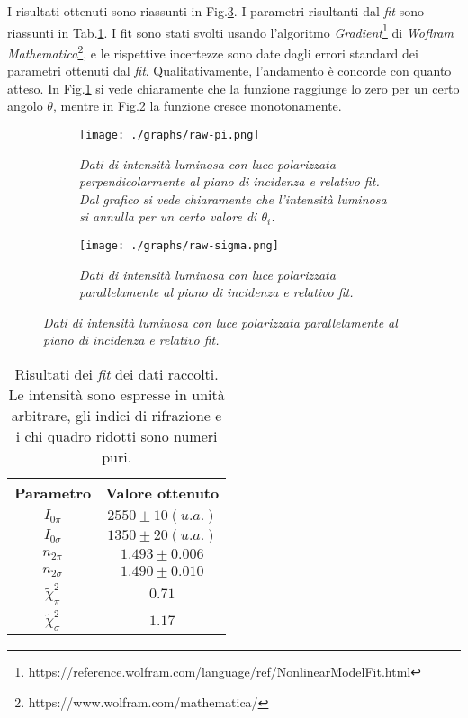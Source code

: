   I risultati ottenuti sono riassunti in Fig.\ref{fig:dati-raw}.
  I parametri risultanti dal \emph{fit} sono riassunti in Tab.\ref{tab:risultati-fit}.
  I fit sono stati svolti usando l'algoritmo \emph{Gradient}\footnote{https://reference.wolfram.com/language/ref/NonlinearModelFit.html} di \emph{Woflram Mathematica}\footnote{https://www.wolfram.com/mathematica/}, e le rispettive incertezze %
  sono date dagli errori standard dei parametri ottenuti dal \emph{fit}.                                          %
  Qualitativamente, l'andamento è concorde con quanto atteso. In Fig.\ref{fig:raw-pi}
  si vede chiaramente che la funzione raggiunge lo zero per un certo angolo $\theta$,
  mentre in Fig.\ref{fig:raw-sigma} la funzione cresce monotonamente.
  \begin{figure}[H]
    \centering
    \caption{Dati raccolti}
    \begin{subfigure}[t]{.4\textwidth}
      \texttt{[image: ./graphs/raw-pi.png]}
      \caption{
        \emph{
          Dati di intensità luminosa con luce polarizzata perpendicolarmente al
          piano di incidenza e relativo fit. Dal grafico si vede chiaramente che
          l'intensità luminosa si annulla per un certo valore di $\theta_i$.
        }
      }
      \label{fig:raw-pi}
    \end{subfigure}
    \hspace{20mm}
    \begin{subfigure}[t]{.4\textwidth}
      \texttt{[image: ./graphs/raw-sigma.png]}
      \caption{
        \emph{
          Dati di intensità luminosa con luce polarizzata parallelamente al
          piano di incidenza e relativo fit.
        }
      }
      \label{fig:raw-sigma}
    \end{subfigure}
    \label{fig:dati-raw}
  \end{figure}
  \begin{table}[ht]
    \centering
    \caption{
      Risultati dei \emph{fit} dei dati raccolti. Le intensità sono espresse in unità arbitrare, gli indici
      di rifrazione e i chi quadro ridotti sono numeri puri.
    }
    \begin{tabular}[t]{cc}
      \toprule
      Parametro &Valore ottenuto\\
      \midrule
      $I_{0\pi}$ &$2550 \pm 10 (u. a.)$ \\
      $I_{0\sigma}$ &$1350 \pm 20 (u. a.)$ \\
      $n_{2\pi}$ &$1.493 \pm 0.006$    \\
      $n_{2\sigma}$ &$1.490 \pm 0.010$    \\
      $\tilde \chi^2_\pi$ &$0.71$ \\
      $\tilde \chi^2_\sigma$ &$1.17$ \\
      \bottomrule
    \end{tabular}\label{tab:risultati-fit}
  \end{table}
